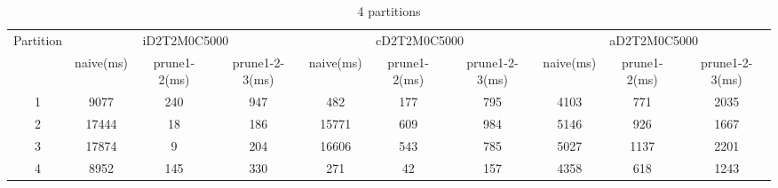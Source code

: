 \begin{table*}[t]
  \centering
\makeatletter
    \long{}
\makeatother
  \caption{4 partitions}
    \vspace*{3pt}
  \footnotesize

  \label{table:partition4}
  \begin{tabular}{|c||c|c|c|c|c|c|c|c|c|}
  \hline
  \multirow{2}{*}{Partition} &  \multicolumn{3}{|c|}{iD2T2M0C5000} & \multicolumn{3}{|c|}{cD2T2M0C5000} &\multicolumn{3}{|c|}{aD2T2M0C5000} \\\cline{2-10}
    &  naive(ms) & prune1-2(ms) & prune1-2-3(ms) & naive(ms) & prune1-2(ms) & prune1-2-3(ms) & naive(ms) & prune1-2(ms) & prune1-2-3(ms) \\\hline \hline

\cline{2-10}
    1 &  9077 & 240 & 947 & 482 & 177 & 795 & 4103 & 771 & 2035 \\\hline

\cline{2-10}
    2 &  17444 & 18 & 186 & 15771 & 609 & 984 & 5146 & 926 & 1667 \\\hline

\cline{2-10}
    3 &  17874 & 9 & 204 & 16606 & 543 & 785 & 5027 & 1137 & 2201 \\\hline
    
\cline{2-10}
    4 &  8952 & 145 & 330 & 271 & 42 & 157 & 4358 & 618 & 1243 \\\hline
    
  \end{tabular}
  \vspace*{-17pt}
\end{table*}


